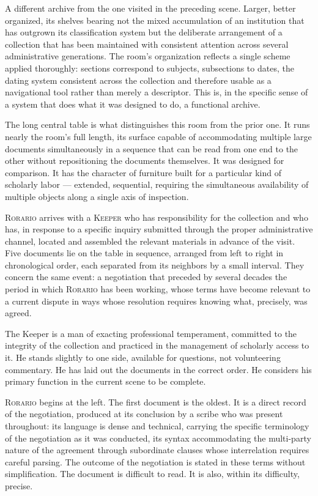 \documentclass[12pt, oneside]{article}
\newenvironment{action}{%
  \vspace{0.6em}%
  \noindent\ignorespaces%
}{%
  \par\vspace{0.6em}%
}
\begin{document}
\begin{action}
A different archive from the one visited in the preceding scene. Larger, better organized, its shelves bearing not the mixed accumulation of an institution that has outgrown its classification system but the deliberate arrangement of a collection that has been maintained with consistent attention across several administrative generations. The room's organization reflects a single scheme applied thoroughly: sections correspond to subjects, subsections to dates, the dating system consistent across the collection and therefore usable as a navigational tool rather than merely a descriptor. This is, in the specific sense of a system that does what it was designed to do, a functional archive.

The long central table is what distinguishes this room from the prior one. It runs nearly the room's full length, its surface capable of accommodating multiple large documents simultaneously in a sequence that can be read from one end to the other without repositioning the documents themselves. It was designed for comparison. It has the character of furniture built for a particular kind of scholarly labor --- extended, sequential, requiring the simultaneous availability of multiple objects along a single axis of inspection.

\textsc{Rorario} arrives with a \textsc{Keeper} who has responsibility for the collection and who has, in response to a specific inquiry submitted through the proper administrative channel, located and assembled the relevant materials in advance of the visit. Five documents lie on the table in sequence, arranged from left to right in chronological order, each separated from its neighbors by a small interval. They concern the same event: a negotiation that preceded by several decades the period in which \textsc{Rorario} has been working, whose terms have become relevant to a current dispute in ways whose resolution requires knowing what, precisely, was agreed.
\end{action}

\begin{action}
The Keeper is a man of exacting professional temperament, committed to the integrity of the collection and practiced in the management of scholarly access to it. He stands slightly to one side, available for questions, not volunteering commentary. He has laid out the documents in the correct order. He considers his primary function in the current scene to be complete.

\textsc{Rorario} begins at the left. The first document is the oldest. It is a direct record of the negotiation, produced at its conclusion by a scribe who was present throughout: its language is dense and technical, carrying the specific terminology of the negotiation as it was conducted, its syntax accommodating the multi-party nature of the agreement through subordinate clauses whose interrelation requires careful parsing. The outcome of the negotiation is stated in these terms without simplification. The document is difficult to read. It is also, within its difficulty, precise.
\end{action}
\end{document}
